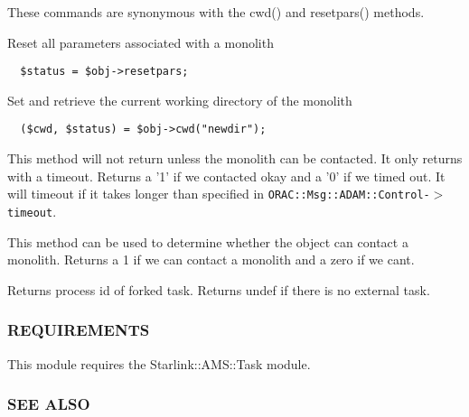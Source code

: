 \begin{description}
\begin{description}
These commands are synonymous with the cwd() and resetpars()
methods.


\item[{\textbf{resetpars}}] \mbox{}

Reset all parameters associated with a monolith

\begin{verbatim}
  $status = $obj->resetpars;
\end{verbatim}

\item[{\textbf{cwd}}] \mbox{}

Set and retrieve the current working directory of the monolith

\begin{verbatim}
  ($cwd, $status) = $obj->cwd("newdir");
\end{verbatim}

\item[{\textbf{contactw}}] \mbox{}

This method will not return unless the monolith can be contacted.
It only returns with a timeout. Returns a '1' if we contacted okay
and a '0' if we timed out. It will timeout if it takes longer than
specified in \texttt{ORAC::Msg::ADAM::Control-$>$timeout}.


\item[{\textbf{contact}}] \mbox{}

This method can be used to determine whether the object can
contact a monolith. Returns a 1 if we can contact a monolith and
a zero if we cant.


\item[{\textbf{pid}}] \mbox{}

Returns process id of forked task.
Returns undef if there is no external task.

\end{description}
\subsubsection*{REQUIREMENTS\label{ORAC::Msg::Task::ADAM_REQUIREMENTS}}


This module requires the Starlink::AMS::Task module.

\subsubsection*{SEE ALSO\label{ORAC::Msg::Task::ADAM_SEE_ALSO}}



\end{description}
